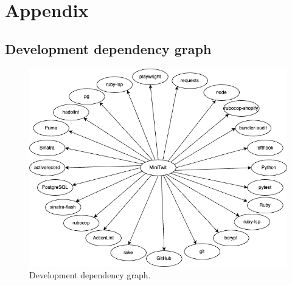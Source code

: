 \documentclass{article}
\begin{document}
\newpage
\section{Appendix}

\subsection{Development dependency graph} \label{appendix: dev-dependecies}
\begin{figure}[H]
    \centering
    \includegraphics[width=\textwidth]{images/dependency-graph-dev.png}
    \caption{Development dependency graph.}
    \label{fig:dep-dev}
\end{figure}
\end{document}
